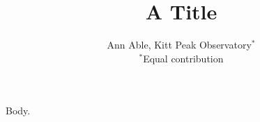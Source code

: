 \documentclass{article}
\begin{document}
\title{A Title}
\author{Ann Able, Kitt Peak Observatory$^*$\\ $^*$Equal contribution}
\maketitle
Body.
\end{document}
